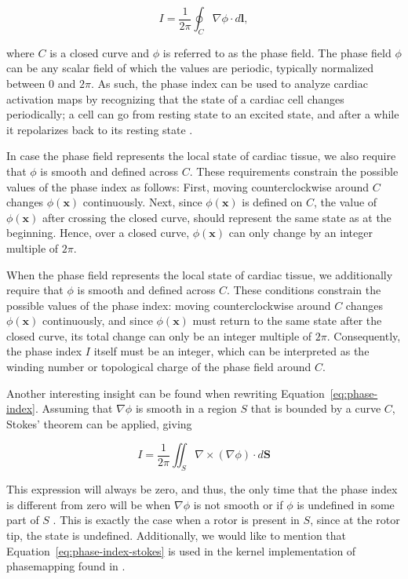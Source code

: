 \documentclass[twocolumn]{article}
\begin{document}
\begin{equation}
  I = \frac{1}{2\pi}\oint_C \nabla \phi \cdot d\bm{l} ,
  \label{eq:phase-index}
\end{equation}

\noindent where $C$ is a closed curve
and $\phi$ is referred to as the phase field.
The phase field $\phi$ can be any scalar field of which the values are periodic,
typically normalized between $0$ and $2\pi$.
As such, the phase index can be used to analyze cardiac activation maps
by recognizing that the state of a cardiac cell changes periodically;
a cell can go from resting state to an excited state,
and after a while it repolarizes back to its resting state \cite{1984theoretical_scrollwaves_chemical_winfree}.

In case the phase field represents the local state of cardiac tissue,
we also require that $\phi$ is smooth and defined across $C$.
These requirements constrain the possible values of the phase index as follows:
First, moving counterclockwise around $C$ changes $\phi(\bm{x})$ continuously.
Next, since $\phi(\bm{x})$ is defined on $C$,
the value of $\phi(\bm{x})$ after crossing the closed curve,
should represent the same state as at the beginning.
Hence, over a closed curve,
$\phi(\bm{x})$ can only change by an integer multiple of $2\pi$.

When the phase field represents the local state of cardiac tissue,
we additionally require that $\phi$ is smooth and defined across $C$.
These conditions constrain the possible values of the phase index:
moving counterclockwise around $C$ changes $\phi(\bm{x})$ continuously,
and since $\phi(\bm{x})$ must return to the same state after the closed curve,
its total change can only be an integer multiple of $2\pi$.
Consequently, the phase index $I$ itself must be an integer,
which can be interpreted as the winding number or topological charge of the phase field around $C$.

Another interesting insight can be found when rewriting Equation~\ref{eq:phase-index}.
Assuming that $\nabla\phi$ is smooth in a region $S$ that is bounded by a curve $C$,
Stokes' theorem can be applied, giving

\begin{equation}
  I = \frac{1}{2\pi} \iint_S \nabla \times (\nabla \phi) \cdot d\bm{S}
  \label{eq:phase-index-stokes}
\end{equation}

\noindent This expression will always be zero,
and thus, the only time that the phase index is different from zero will be when
$\nabla \phi$ is not smooth or if $\phi$ is undefined in some part of $S$ \autocite{herlin2012reconstruction}.
This is exactly the case when a rotor is present in $S$,
since at the rotor tip, the state is undefined.
Additionally, we would like to mention that Equation~\ref{eq:phase-index-stokes}
is used in the kernel implementation of phasemapping found in \textcite{2001theoretical_convolution_method_bray}.
\end{document}
